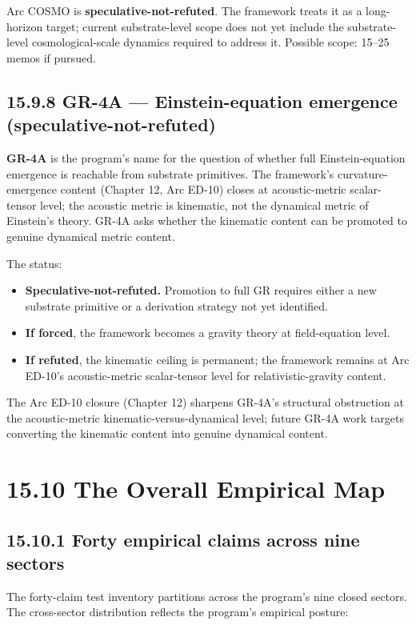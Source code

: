 \documentclass[11pt]{book}
\begin{document}
Arc COSMO is \textbf{speculative-not-refuted}. The framework treats it as a long-horizon target; current substrate-level scope does not yet include the substrate-level cosmological-scale dynamics required to address it. Possible scope: 15–25 memos if pursued.

\subsection{15.9.8 GR-4A — Einstein-equation emergence (speculative-not-refuted)}

\textbf{GR-4A} is the program's name for the question of whether full Einstein-equation emergence is reachable from substrate primitives. The framework's curvature-emergence content (Chapter 12, Arc ED-10) closes at acoustic-metric scalar-tensor level; the acoustic metric is kinematic, not the dynamical metric of Einstein's theory. GR-4A asks whether the kinematic content can be promoted to genuine dynamical metric content.

The status:
\begin{itemize}
\item \textbf{Speculative-not-refuted.} Promotion to full GR requires either a new substrate primitive or a derivation strategy not yet identified.
\item \textbf{If forced}, the framework becomes a gravity theory at field-equation level.
\item \textbf{If refuted}, the kinematic ceiling is permanent; the framework remains at Arc ED-10's acoustic-metric scalar-tensor level for relativistic-gravity content.
\end{itemize}

The Arc ED-10 closure (Chapter 12) sharpens GR-4A's structural obstruction at the acoustic-metric kinematic-versus-dynamical level; future GR-4A work targets converting the kinematic content into genuine dynamical content.

\section{15.10 The Overall Empirical Map}

\subsection{15.10.1 Forty empirical claims across nine sectors}

The forty-claim test inventory partitions across the program's nine closed sectors. The cross-sector distribution reflects the program's empirical posture:
\end{document}
